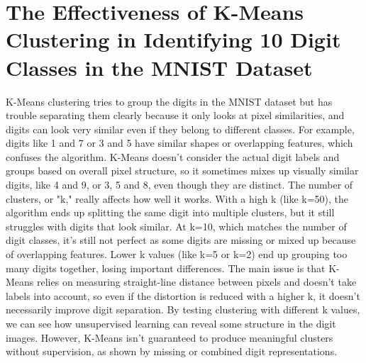 \documentclass{article}
\begin{document}
\section {The Effectiveness of K-Means Clustering in Identifying 10 Digit Classes in the MNIST Dataset}
K-Means clustering tries to group the digits in the MNIST dataset but has trouble separating them clearly because it only looks at pixel similarities, and digits can look very similar even if they belong to different classes. For example, digits like 1 and 7 or 3 and 5 have similar shapes or overlapping features, which confuses the algorithm. K-Means doesn’t consider the actual digit labels and groups based on overall pixel structure, so it sometimes mixes up visually similar digits, like 4 and 9, or 3, 5 and 8, even though they are distinct. The number of clusters, or "k," really affects how well it works. With a high k (like k=50), the algorithm ends up splitting the same digit into multiple clusters, but it still struggles with digits that look similar. At k=10, which matches the number of digit classes, it’s still not perfect as some digits are missing or mixed up because of overlapping features. Lower k values (like k=5 or k=2) end up grouping too many digits together, losing important differences. The main issue is that K-Means relies on measuring straight-line distance between pixels and doesn’t take labels into account, so even if the distortion is reduced with a higher k, it doesn’t necessarily improve digit separation. By testing clustering with different k values, we can see how unsupervised learning can reveal some structure in the digit images. However, K-Means isn’t guaranteed to produce meaningful clusters without supervision, as shown by missing or combined digit representations. 
\end{document}
